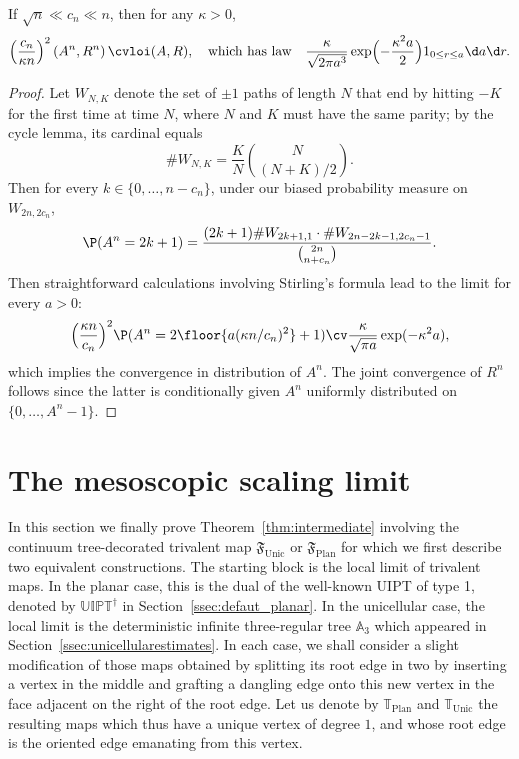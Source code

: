 \begin{proposition}\label{prop:volume_arbre_racine}
If $\sqrt{n} \ll c_n \ll n$, then for any $\kappa >0$,
\[
\left(\frac{c_n}{\kappa n}\right)^2 \left(A^n, R^n\right) \cvloi (A, R),
\quad\text{which has law}\quad
\frac{\kappa}{\sqrt{2 \pi a^3}} \exp\Bigl(- \frac{\kappa^2 a}{2}\Bigr) 1_{0 \le r \le a} \d a \d r.
\]
\end{proposition}

\begin{proof}
Let $W_{N,K}$ denote the set of $\pm1$ paths of length $N$ that end by hitting $-K$ for the first time at time $N$, where $N$ and $K$ must have the same parity; by the cycle lemma, its cardinal equals
\[
\#W_{N,K} = \frac{K}{N} \binom{N}{(N+K)/2}.
\]
Then for every $k \in \{0, \dots, n-c_{n}\}$, under our biased probability measure on $W_{2n, 2c_{n}}$,
\[
\P(A^n = 2k+1) = \frac{(2k+1) \#W_{2k+1,1} \cdot \#W_{2n-2k-1, 2c_{n}-1}}{\binom{2n}{n+c_{n}}}.
\]
Then straightforward calculations involving Stirling's formula lead to the limit for every $a>0$:
\[
\Bigl(\frac{\kappa n}{c_n}\Bigr)^2 \P(A^n = 2\floor{a (\kappa n/c_n)^2}+1)
\cv \frac{\kappa}{\sqrt{\pi a}} \exp(- \kappa^2 a),
\]
which implies the convergence in distribution of $A^n$.
The joint convergence of $R^n$ follows since the latter is conditionally given $A^n$ uniformly distributed on \hbox{$\{0, \dots, A^n\!-\!1\}$}.
\end{proof}

\section{The mesoscopic scaling limit}
\label{sec:mesoscopic}

In this section we finally prove Theorem~\ref{thm:intermediate} involving the continuum tree-decorated trivalent map $\mathfrak{F}_{ \mathrm{Unic}}$ or $\mathfrak{F}_{ \mathrm{Plan}}$ for which we first describe two equivalent constructions. The starting block is the local limit of trivalent maps.
In the planar case, this is the dual of the well-known UIPT of type 1, denoted by $\mathbb{UIPT}^\dagger$ in Section~\ref{ssec:defaut_planar}. In the unicellular case, the local limit is the deterministic infinite three-regular tree $\mathbb{A}_3$ which appeared in Section~\ref{ssec:unicellularestimates}.
In each case, we shall consider a slight modification of those maps obtained by splitting its root edge in two by inserting a vertex in the middle and grafting a dangling edge onto this new vertex in the face adjacent on the right of the root edge. Let us denote by $\mathbb{T}_ \mathrm{Plan}$ and $\mathbb{T}_{ \mathrm{Unic}}$ the resulting maps which thus have a unique vertex of degree $1$, and whose root edge is the oriented edge emanating from this vertex.

